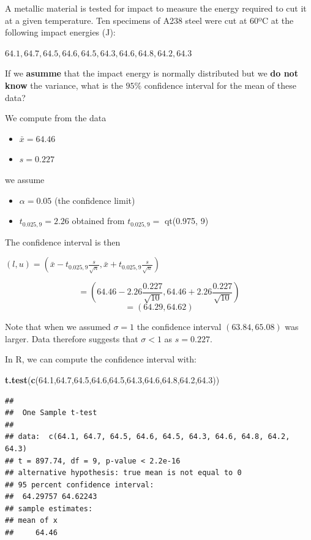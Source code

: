 \documentclass[
]{book}
\newenvironment{Shaded}{\begin{snugshade}}{\end{snugshade}}
\newcommand{\FloatTok}[1]{\textcolor[rgb]{0.00,0.00,0.81}{#1}}
\newcommand{\FunctionTok}[1]{\textcolor[rgb]{0.13,0.29,0.53}{\textbf{#1}}}
\newcommand{\NormalTok}[1]{#1}
\providecommand{\tightlist}{%
  \setlength{\itemsep}{0pt}\setlength{\parskip}{0pt}}
\begin{document}
A metallic material is tested for impact to measure the energy required to cut it at a given temperature. Ten specimens of A238 steel were cut at 60ºC at the following impact energies (J):

\(64.1, 64.7, 64.5, 64.6, 64.5, 64.3, 64.6, 64.8, 64.2, 64.3\)

If we \textbf{asumme} that the impact energy is normally distributed but we \textbf{do not know} the variance, what is the \(95\%\) confidence interval for the mean of these data?

We compute from the data

\begin{itemize}
\tightlist
\item
  \(\bar{x}=64.46\)
\item
  \(s=0.227\)
\end{itemize}

we assume

\begin{itemize}
\tightlist
\item
  \(\alpha=0.05\) (the confidence limit)
\item
  \(t_{0.025,9}=2.26\) obtained from \(t_{0.025,9}=\) qt(0.975, 9)
\end{itemize}

The confidence interval is then

\((l,u)=(\bar{x}- t_{0.025,9}\frac{s}{\sqrt{n}},\bar{x}+t_{0.025,9} \frac{s}{\sqrt{n}})\)

\[=(64.46-2.26 \frac{0.227}{\sqrt{10}},64.46+2.26 \frac{0.227}{\sqrt{10}})\] \[=(64.29,64.62)\]

Note that when we assumed \(\sigma=1\) the confidence interval \((63.84,65.08)\) was larger. Data therefore suggests that \(\sigma<1\) as \(s=0.227\).

In R, we can compute the confidence interval with:

\begin{Shaded}
\begin{Highlighting}[]
\FunctionTok{t.test}\NormalTok{(}\FunctionTok{c}\NormalTok{(}\FloatTok{64.1}\NormalTok{,}\FloatTok{64.7}\NormalTok{,}\FloatTok{64.5}\NormalTok{,}\FloatTok{64.6}\NormalTok{,}\FloatTok{64.5}\NormalTok{,}\FloatTok{64.3}\NormalTok{,}\FloatTok{64.6}\NormalTok{,}\FloatTok{64.8}\NormalTok{,}\FloatTok{64.2}\NormalTok{,}\FloatTok{64.3}\NormalTok{))}
\end{Highlighting}
\end{Shaded}

\begin{verbatim}
## 
##  One Sample t-test
## 
## data:  c(64.1, 64.7, 64.5, 64.6, 64.5, 64.3, 64.6, 64.8, 64.2, 64.3)
## t = 897.74, df = 9, p-value < 2.2e-16
## alternative hypothesis: true mean is not equal to 0
## 95 percent confidence interval:
##  64.29757 64.62243
## sample estimates:
## mean of x 
##     64.46
\end{verbatim}
\end{document}
